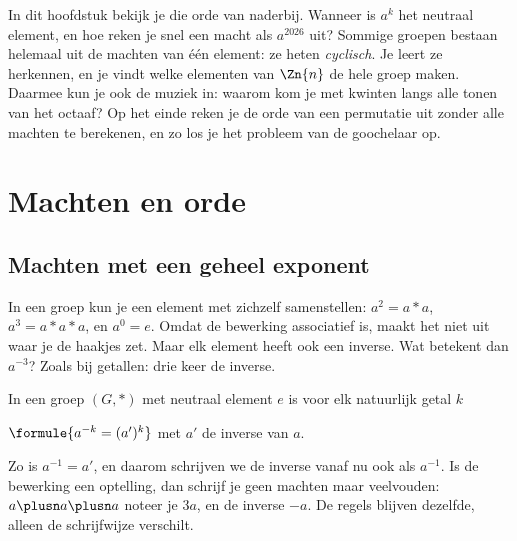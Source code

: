 In dit hoofdstuk bekijk je die orde van naderbij. Wanneer is $a^k$ het neutraal element, en hoe reken je snel een macht als $a^{2026}$ uit? Sommige groepen bestaan helemaal uit de machten van één element: ze heten \textit{cyclisch}. Je leert ze herkennen, en je vindt welke elementen van $\Zn{n}$ de hele groep maken. Daarmee kun je ook de muziek in: waarom kom je met kwinten langs alle tonen van het octaaf? Op het einde reken je de orde van een permutatie uit zonder alle machten te berekenen, en zo los je het probleem van de goochelaar op.

\begin{oefeningen}[Start]

\end{oefeningen}


\section{Machten en orde}

\subsection{Machten met een geheel exponent}

In een groep kun je een element met zichzelf samenstellen: $a^2 = a \ast a$, $a^3 = a \ast a \ast a$, en $a^0 = e$. Omdat de bewerking associatief is, maakt het niet uit waar je de haakjes zet. Maar elk element heeft ook een inverse. Wat betekent dan $a^{-3}$? Zoals bij getallen: drie keer de inverse.

\begin{theorie}
In een groep $(G, \ast)$ met neutraal element $e$ is voor elk natuurlijk getal $k$

\vspace{1mm}
\qquad $\formule{a^{-k} = (a')^k}$ \qquad met $a'$ de inverse van $a$.
\end{theorie}

Zo is $a^{-1} = a'$, en daarom schrijven we de inverse vanaf nu ook als $a^{-1}$. Is de bewerking een optelling, dan schrijf je geen machten maar veelvouden: $a \plusn a \plusn a$ noteer je $3a$, en de inverse $-a$. De regels blijven dezelfde, alleen de schrijfwijze verschilt.

